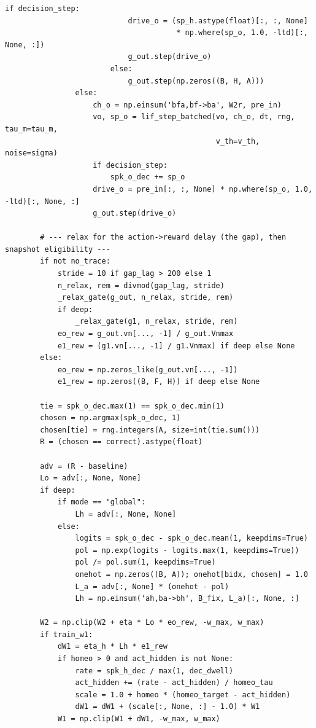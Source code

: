 \begin{lstlisting}[caption={mrl\_trace/distal\_cue.py},label={lst:siox-src-distal_cue}]
                        if decision_step:
                            drive_o = (sp_h.astype(float)[:, :, None]
                                       * np.where(sp_o, 1.0, -ltd)[:, None, :])
                            g_out.step(drive_o)
                        else:
                            g_out.step(np.zeros((B, H, A)))
                else:
                    ch_o = np.einsum('bfa,bf->ba', W2r, pre_in)
                    vo, sp_o = lif_step_batched(vo, ch_o, dt, rng, tau_m=tau_m,
                                                v_th=v_th, noise=sigma)
                    if decision_step:
                        spk_o_dec += sp_o
                    drive_o = pre_in[:, :, None] * np.where(sp_o, 1.0, -ltd)[:, None, :]
                    g_out.step(drive_o)

        # --- relax for the action->reward delay (the gap), then snapshot eligibility ---
        if not no_trace:
            stride = 10 if gap_lag > 200 else 1
            n_relax, rem = divmod(gap_lag, stride)
            _relax_gate(g_out, n_relax, stride, rem)
            if deep:
                _relax_gate(g1, n_relax, stride, rem)
            eo_rew = g_out.vn[..., -1] / g_out.Vnmax
            e1_rew = (g1.vn[..., -1] / g1.Vnmax) if deep else None
        else:
            eo_rew = np.zeros_like(g_out.vn[..., -1])
            e1_rew = np.zeros((B, F, H)) if deep else None

        tie = spk_o_dec.max(1) == spk_o_dec.min(1)
        chosen = np.argmax(spk_o_dec, 1)
        chosen[tie] = rng.integers(A, size=int(tie.sum()))
        R = (chosen == correct).astype(float)

        adv = (R - baseline)
        Lo = adv[:, None, None]
        if deep:
            if mode == "global":
                Lh = adv[:, None, None]
            else:
                logits = spk_o_dec - spk_o_dec.mean(1, keepdims=True)
                pol = np.exp(logits - logits.max(1, keepdims=True))
                pol /= pol.sum(1, keepdims=True)
                onehot = np.zeros((B, A)); onehot[bidx, chosen] = 1.0
                L_a = adv[:, None] * (onehot - pol)
                Lh = np.einsum('ah,ba->bh', B_fix, L_a)[:, None, :]

        W2 = np.clip(W2 + eta * Lo * eo_rew, -w_max, w_max)
        if train_w1:
            dW1 = eta_h * Lh * e1_rew
            if homeo > 0 and act_hidden is not None:
                rate = spk_h_dec / max(1, dec_dwell)
                act_hidden += (rate - act_hidden) / homeo_tau
                scale = 1.0 + homeo * (homeo_target - act_hidden)
                dW1 = dW1 + (scale[:, None, :] - 1.0) * W1
            W1 = np.clip(W1 + dW1, -w_max, w_max)


\end{lstlisting}
